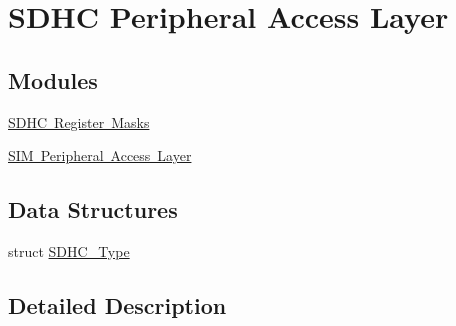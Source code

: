\hypertarget{group___s_d_h_c___peripheral___access___layer}{}\section{S\+D\+HC Peripheral Access Layer}
\label{group___s_d_h_c___peripheral___access___layer}
\subsection*{Modules}
\begin{DoxyCompactItemize}
\item 
\mbox{\hyperlink{group___s_d_h_c___register___masks}{S\+D\+H\+C Register Masks}}
\item 
\mbox{\hyperlink{group___s_i_m___peripheral___access___layer}{S\+I\+M Peripheral Access Layer}}
\end{DoxyCompactItemize}
\subsection*{Data Structures}
\begin{DoxyCompactItemize}
\item 
struct \mbox{\hyperlink{struct_s_d_h_c___type}{S\+D\+H\+C\+\_\+\+Type}}
\end{DoxyCompactItemize}


\subsection{Detailed Description}
